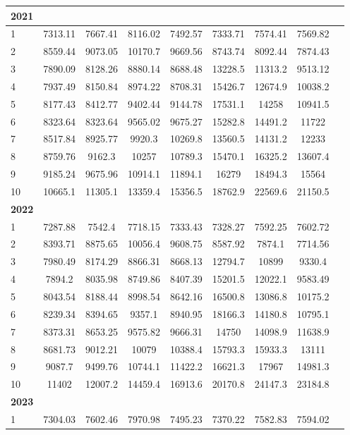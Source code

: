 \documentclass[jmse,article,submit,pdftex,moreauthors]{Definitions/mdpi}
\begin{document}
\begin{longtable}{@{\extracolsep{\fill}}p{1.5cm}cccccccc@{}}
\bf{2021} &  &  &  & & & & \\
\hline
1 & 7313.11 & 7667.41 & 8116.02 & 7492.57 & 7333.71 & 7574.41 & 7569.82 \\
2 & 8559.44 & 9073.05 & 10170.7 & 9669.56 & 8743.74 & 8092.44 & 7874.43 \\
3 & 7890.09 & 8128.26 & 8880.14 & 8688.48 & 13228.5 & 11313.2 & 9513.12 \\
4 & 7937.49 & 8150.84 & 8974.22 & 8708.31 & 15426.7 & 12674.9 & 10038.2 \\
5 & 8177.43 & 8412.77 & 9402.44 & 9144.78 & 17531.1 & 14258 & 10941.5 \\
6 & 8323.64 & 8323.64 & 9565.02 & 9675.27 & 15282.8 & 14491.2 & 11722 \\
7 & 8517.84 & 8925.77 & 9920.3 & 10269.8 & 13560.5 & 14131.2 & 12233 \\
8 & 8759.76 & 9162.3 & 10257 & 10789.3 & 15470.1 & 16325.2 & 13607.4 \\
9 & 9185.24 & 9675.96 & 10914.1 & 11894.1 & 16279 & 18494.3 & 15564 \\
10 & 10665.1 & 11305.1 & 13359.4 & 15356.5 & 18762.9 & 22569.6 & 21150.5 \\
\hline
\bf{2022} &  &  &  & & & & \\
\hline
1 & 7287.88 & 7542.4 & 7718.15 & 7333.43 & 7328.27 & 7592.25 & 7602.72 \\
2 & 8393.71 & 8875.65 & 10056.4 & 9608.75 & 8587.92 & 7874.1 & 7714.56 \\
3 & 7980.49 & 8174.29 & 8866.31 & 8668.13 & 12794.7 & 10899 & 9330.4 \\
4 & 7894.2 & 8035.98 & 8749.86 & 8407.39 & 15201.5 & 12022.1 & 9583.49 \\
5 & 8043.54 & 8188.44 & 8998.54 & 8642.16 & 16500.8 & 13086.8 & 10175.2 \\
6 & 8239.34 & 8394.65 & 9357.1 & 8940.95 & 18166.3 & 14180.8 & 10795.1 \\
7 & 8373.31 & 8653.25 & 9575.82 & 9666.31 & 14750 & 14098.9 & 11638.9 \\
8 & 8681.73 & 9012.21 & 10079 & 10388.4 & 15793.3 & 15933.3 & 13111 \\
9 & 9087.7 & 9499.76 & 10744.1 & 11422.2 & 16621.3 & 17967 & 14981.3 \\
10 & 11402 & 12007.2 & 14459.4 & 16913.6 & 20170.8 & 24147.3 & 23184.8 \\
\hline
\bf{2023} &  &  &  & & & & \\
\hline
1 & 7304.03 & 7602.46 & 7970.98 & 7495.23 & 7370.22 & 7582.83 & 7594.02 \\

\end{longtable}
\end{document}
